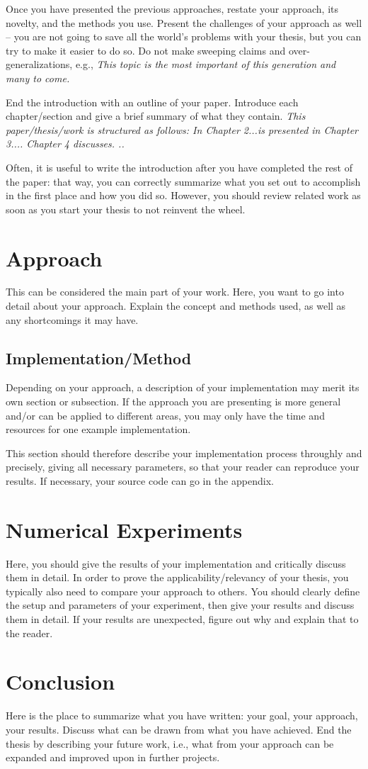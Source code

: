 Once you have presented the previous approaches, restate your approach, its novelty, and the methods you use.
Present the challenges of your approach as well -- you are not going to save all the world's problems with your thesis, but you can try to make it
easier to do so.
Do not make sweeping claims and over-generalizations, e.g., \textit{This topic is the most important of this generation and many to come.
}

End the introduction with an outline of your paper.
Introduce each chapter/section and give a brief summary of what they contain.
\textit{This paper/thesis/work is structured as follows: In Chapter 2...is presented in Chapter 3....
	Chapter 4 discusses.
	..}

Often, it is useful to write the introduction after you have completed the rest of the paper: that way, you can correctly summarize what you set out
to accomplish in the first place and how you did so.
However, you should review related work as soon as you start your thesis to not reinvent the wheel.

\section{Approach}
This can be considered the main part of your work.
Here, you want to go into detail about your approach.
Explain the concept and methods used, as well as any shortcomings it may have.

\subsection{Implementation/Method}
Depending on your approach, a description of your implementation may merit its own section or subsection.
If the approach you are presenting is more general and/or can be applied to different areas, you may only have the time and resources for one example
implementation.

This section should therefore describe your implementation process throughly and precisely, giving all necessary parameters, so that your reader can
reproduce your results.
If necessary, your source code can go in the appendix.

\section{Numerical Experiments}
Here, you should give the results of your implementation and critically discuss them in detail.
In order to prove the applicability/relevancy of your thesis, you typically also need to compare your approach to others.
You should clearly define the setup and parameters of your experiment, then give your results and discuss them in detail.
If your results are unexpected, figure out why and explain that to the reader.

\section{Conclusion}
Here is the place to summarize what you have written: your goal, your approach, your results.
Discuss what can be drawn from what you have achieved.
End the thesis by describing your future work, i.e., what from your approach can be expanded and improved upon in further projects.
